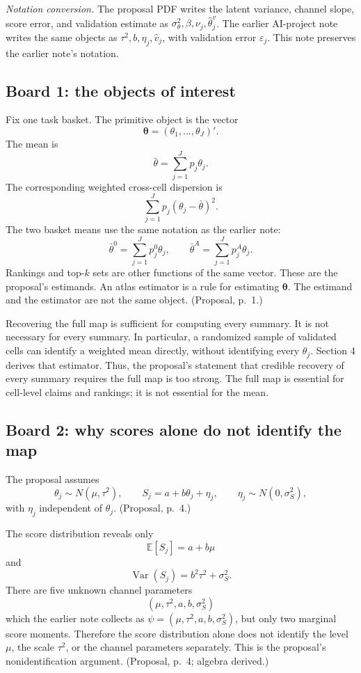 \documentclass[11pt]{article}
\newcommand{\E}{\mathbb{E}}
\newcommand{\Var}{\operatorname{Var}}
\newcommand{\thetav}{\boldsymbol{\theta}}
\begin{document}
  \noindent\textit{Notation conversion.}
  The proposal PDF writes the latent variance, channel slope, score error, and
  validation estimate as \(\sigma_\theta^2,\beta,\nu_j,\widehat\theta_j^v\).
  The earlier AI-project note writes the same objects as
  \(\tau^2,b,\eta_j,\widehat v_j\), with validation error
  \(\varepsilon_j\). This note preserves the earlier note's notation.
  
  \subsection*{Board 1: the objects of interest}
  
  Fix one task basket. The primitive object is the vector
  \[
      \thetav
      =(\theta_1,\ldots,\theta_J)'.
  \]
  The mean is
  \[
      \bar\theta=\sum_{j=1}^Jp_j\theta_j.
  \]
  The corresponding weighted cross-cell dispersion is
  \[
      \sum_{j=1}^Jp_j(\theta_j-\bar\theta)^2.
  \]
  The two basket means use the same notation as the earlier note:
  \[
      \bar\theta^0=\sum_{j=1}^Jp_j^0\theta_j,
      \qquad
      \bar\theta^A=\sum_{j=1}^Jp_j^A\theta_j.
  \]
  Rankings and top-\(k\) sets are other functions of the same vector.
  These are the proposal's estimands. An atlas estimator is a rule for estimating
  \(\thetav\). The estimand and the estimator are not the same
  object. (Proposal, p.~1.)
  
  Recovering the full map is sufficient for computing every summary. It is not
  necessary for every summary. In particular, a randomized sample of validated
  cells can identify a weighted mean directly, without identifying every
  \(\theta_j\). Section 4 derives that estimator. Thus, the proposal's statement
  that credible recovery of every summary requires the full map is too strong.
  The full map is essential for cell-level claims and rankings; it is not
  essential for the mean.
  
  \subsection*{Board 2: why scores alone do not identify the map}
  
  The proposal assumes
  \[
      \theta_j\sim N(\mu,\tau^2),
      \qquad
      S_j=a+b\theta_j+\eta_j,
      \qquad
      \eta_j\sim N(0,\sigma_S^2),
  \]
  with \(\eta_j\) independent of \(\theta_j\). (Proposal, p.~4.)
  
  The score distribution reveals only
  \[
      \E[S_j]=a+b\mu
  \]
  and
  \[
      \Var(S_j)=b^2\tau^2+\sigma_S^2.
  \]
  There are five unknown channel parameters
  \[
      (\mu,\tau^2,a,b,\sigma_S^2)
  \]
  which the earlier note collects as
  \(\psi=(\mu,\tau^2,a,b,\sigma_S^2)\),
  but only two marginal score moments. Therefore the score distribution alone
  does not identify the level \(\mu\), the scale \(\tau^2\), or the
  channel parameters separately. This is the proposal's nonidentification
  argument. (Proposal, p.~4; algebra derived.)
  
\end{document}
